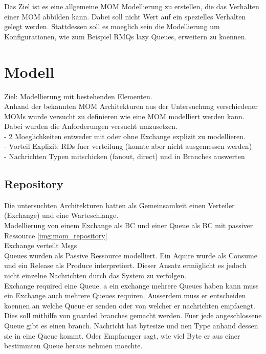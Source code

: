 Das Ziel ist es eine allgemeine MOM Modellierung zu erstellen, die das Verhalten einer MOM abbilden kann. Dabei soll nicht Wert auf ein spezielles Verhalten gelegt werden. Stattdessen soll es moeglich sein die Modellierung um Konfigurationen, wie zum Beispiel RMQs lazy Queues, erweitern zu koennen. 

\section{Modell}
Ziel: Modellierung mit bestehenden Elementen.\\
Anhand der bekannten MOM Architekturen aus der Untersuchung verschiedener MOMs wurde versucht zu definieren wie eine MOM modelliert werden kann. Dabei wurden die Anforderungen versucht umzusetzen. \\
- 2 Moeglichkeiten entweder mit oder ohne Exchange explizit zu modellieren.\\
- Vorteil Explizit: RDs fuer verteilung (konnte aber nicht ausgemessen werden) \\
- Nachrichten Typen mitschicken (fanout, direct) und in Branches auswerten

\subsection{Repository}
Die untersuchten Architekturen hatten als Gemeinsamkeit einen Verteiler (Exchange) und eine Warteschlange. \\

Modellierung von einem Exchange als BC und einer Queue als BC mit passiver Ressource \autoref{img:mom_repository} \\

Exchange verteilt Msgs\\

Queues wurden als Passive Ressource modelliert. Ein Aquire wurde als Consume und ein Release als Produce interpretiert. Dieser Ansatz ermöglicht es jedoch nicht einzelne Nachrichten durch das System zu verfolgen. \\

Exchange required eine Queue. a ein exchange mehrere Queues haben kann muss ein Exchange auch mehrere Queues requiren. Ausserdem muss er entscheiden koennen an welche Queue er senden oder von welcher er nachrichten empfaengt. Dies soll mithilfe von guarded branches gemacht werden. Fuer jede angeschlossene Queue gibt es einen branch. Nachricht hat bytesize und nen Type anhand dessen sie in eine Queue kommt. Oder Empfaenger sagt, wie viel Byte er aus einer bestimmten Queue heraus nehmen moechte. \\

